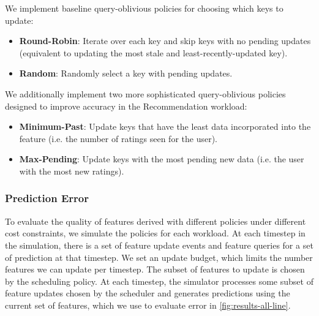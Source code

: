 We implement baseline query-oblivious policies for choosing which keys to update: 
\begin{itemize}
    \item \textbf{Round-Robin}: Iterate over each key and skip keys with no pending updates (equivalent to updating the most stale and least-recently-updated key). 
    \item \textbf{Random}: Randomly select a key with pending updates. 
\end{itemize}
We additionally implement two more sophisticated query-oblivious policies designed to improve accuracy in the Recommendation workload:  
\begin{itemize}
    \item \textbf{Minimum-Past}: Update keys that have the least data incorporated into the feature (i.e. the number of ratings seen for the user). 
    \item \textbf{Max-Pending}: Update keys with the most pending new data (i.e. the user with the most new ratings).
\end{itemize}



\subsubsection{Prediction Error }

To evaluate the quality of features derived with different policies under different cost constraints, we simulate the policies for each workload.  
%
At each timestep in the simulation, there is a set of feature update events and feature queries for a set of prediction at that timestep. 
%
We set an update budget, which limits the number features we can update per timestep. 
%
The subset of features to update is chosen by the scheduling policy. 
%
At each timestep, the simulator processes some subset of feature updates chosen by the scheduler and generates predictions using the current set of features, which we use to evaluate error in \cref{fig:results-all-line}. 

%
